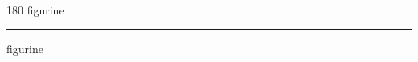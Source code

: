 
\begin{frame}
\begin{center}
\begin{turn}{180}
{\fontsize{2.5cm}{1em}\selectfont figurine}
\end{turn}
\vspace{1em}\par  
\hrule
\vspace{1em}\par  
{\fontsize{2.5cm}{1em}\selectfont figurine}
\end{center}
\end{frame}
